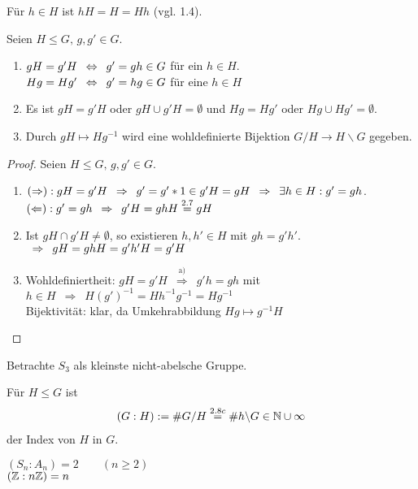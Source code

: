 \begin{bsp}
	Für $h \in H$ ist $hH = H = Hh$ (vgl. 1.4).
\end{bsp}

\begin{lemma}
	Seien $H \leq G, \, g,g' \in G$.
	\begin{enumerate}
		\item $gH = g'H \enspace \Leftrightarrow \enspace g' = gh \in G$ für ein $h \in H$. \\
		$Hg = Hg' \enspace \Leftrightarrow \enspace g' = hg \in G$ für eine $h \in H$
		\item Es ist $gH = g'H$ oder $gH \cup g'H = \emptyset$ und $Hg = Hg'$ oder $Hg \cup Hg' = \emptyset$.
		\item Durch $gH \mapsto Hg^{-1}$ wird eine wohldefinierte Bijektion $G/H \to H \backslash G$ gegeben.
	\end{enumerate}
\end{lemma}
\begin{proof}
	Seien $H \leq G, \, g,g' \in G$.
	\begin{enumerate}
		\item $(\Rightarrow): gH = g'H \enspace \Rightarrow \enspace g' = g' * 1 \in g'H=gH \enspace \Rightarrow \enspace \exists h \in H: g' = gh$. \\
		$(\Leftarrow): g' = gh \enspace \Rightarrow \enspace g'H = ghH \overset{2.7}{=} gH$
		\item Ist $gH \cap g'H \neq \emptyset$, so existieren $h,h' \in H$ mit $gh =g'h'$. $\enspace \Rightarrow \enspace gH=ghH=g'h'H=g'H$
		\item Wohldefiniertheit: $gH=g'H \enspace \overset{\text{a)}}{\Rightarrow} \enspace g'h=gh$ mit $h \in H \enspace \Rightarrow \enspace H(g')^{-1} =Hh^{-1}g^{-1} = Hg^{-1}$ \\
		Bijektivität: klar, da Umkehrabbildung $Hg \mapsto g^{-1}H$
	\end{enumerate}
\end{proof}

\begin{bsppure}
	Betrachte $S_3$ als kleinste nicht-abelsche Gruppe.
\end{bsppure}

\begin{defin}
	Für $H \leq G$ ist
	\begin{align*}
		(G:H) := \# G/H \overset{2.8c}{=} \# h \backslash G \in \mathbb{N} \cup {\infty}
	\end{align*}
	der Index von $H$ in $G$.
\end{defin}

\begin{bsp}
	$(S_n : A_n) = 2 \qquad (n \geq 2)$ \\
	$(\mathbb{Z} : n\mathbb{Z}) = n$
\end{bsp}

